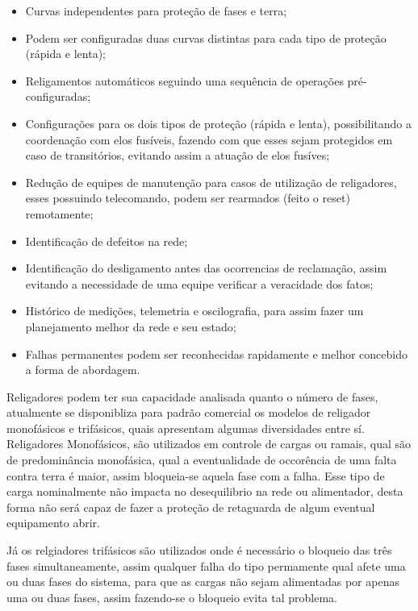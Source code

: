 \documentclass[oneside,openright,12pt]{ufsm_2021} %
\begin{document}
\begin{itemize}
	\item Curvas independentes para proteção de fases e terra;
	\item Podem ser configuradas duas curvas distintas para cada tipo de proteção (rápida e lenta);
	\item Religamentos automáticos seguindo uma sequência de operações pré-configuradas;
	\item Configurações para os dois tipos de proteção (rápida e lenta), possibilitando a coordenação com elos fusíveis, fazendo com que esses sejam protegidos em caso de transitórios, evitando assim a atuação de elos fusíves;
	\item Redução de equipes de manutenção para casos de utilização de religadores, esses possuindo telecomando, podem ser rearmados (feito o reset) remotamente;
	\item Identificação de defeitos na rede;
	\item Identificação do desligamento antes das ocorrencias de reclamação, assim evitando a necessidade de uma equipe verificar a veracidade dos fatos;
	\item Histórico de medições, telemetria e oscilografia, para assim fazer um planejamento melhor da rede e seu estado;
	\item Falhas permanentes podem ser reconhecidas rapidamente e melhor concebido a forma de abordagem.
\end{itemize}

\par Religadores podem ter sua capacidade analisada quanto o número de fases, atualmente se disponibliza para padrão comercial os modelos de religador monofásicos e trifásicos, quais apresentam algumas diversidades entre sí.
Religadores Monofásicos, são utilizados em controle de cargas ou ramais, qual são de predominância monofásica, qual a eventualidade de occorência de uma falta contra terra é maior, assim bloqueia-se aquela fase com a falha. Esse tipo de carga nominalmente não impacta no desequilibrio na rede ou alimentador, desta forma não será capaz de fazer a proteção de retaguarda de algum eventual equipamento abrir.

\par Já os relgiadores trifásicos são utilizados onde é necessário o bloqueio das três fases simultaneamente, assim qualquer falha do tipo permamente qual afete uma ou duas fases do sistema, para que as cargas não sejam alimentadas por apenas uma ou duas fases, assim fazendo-se o bloqueio evita tal problema.
\end{document}
